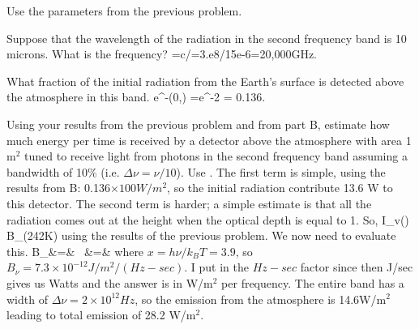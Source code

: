 \documentclass[11pt]{article}
\begin{document}
{ Use the parameters from the previous problem.

\bee
\item Suppose that the wavelength of the radiation in the second frequency band is 10 microns. What is the frequency?
 {\color{red}
\be
\nu=c/\lambda=3.e8/15e-6=20,000GHz.\ee}
\item What fraction of the initial radiation from the Earth's surface is detected above the atmosphere in this band.
  {\color{red}
\be e^{-\tau(0,\infty)} =e^{-2} = 0.136.\ee
}

\item Using your results from the previous problem and from part B, estimate how much energy per time is received by a detector above the atmosphere with area 1 m$^2$ tuned to receive light from photons in the second frequency band assuming a bandwidth of 10\% (i.e. $\Delta\nu=\nu/10$).
 {\color{red}
Use . The first term is simple, using the results from B: 0.136$\times 100 W/m^2$, so the initial radiation contribute 13.6 W to this detector.
The second term is harder; a simple estimate is that all the radiation comes out at the height when the optical depth is equal to 1. So,
\be
I_v(\infty) \simeq B_\nu(242K)
\ee
using the results of the previous problem. We now need to evaluate this. 
\bea
B_\nu &=&  \,\vs
&=&
\eea
where $x=h\nu/k_BT=3.9$, so $B_\nu=7.3\times 10^{-12} J/m^2/(Hz-sec)$. I put in the $Hz-sec$ factor since then J/sec gives us Watts and the answer is in W/m$^2$ per frequency. The entire band has a width of $\Delta\nu=2\times 10^{12}Hz$, so the emission from the atmosphere is 14.6W/m$^2$ leading to total emission of 28.2 W/m$^2$.
}
\eee}
\newpage
\appendix
\end{document}
